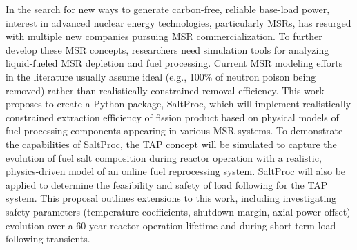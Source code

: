 In the search for new ways to generate carbon-free, reliable 
base-load power, interest in advanced nuclear energy technologies, 
particularly \glspl{MSR}, has resurged with multiple new companies 
pursuing \gls{MSR} commercialization. To further develop these \gls{MSR} 
concepts, researchers need simulation tools for analyzing liquid-fueled 
\gls{MSR} depletion and fuel processing. Current \gls{MSR} modeling efforts in 
the literature usually assume ideal (e.g., 100\% of neutron poison being 
removed) rather than realistically constrained removal efficiency. This work 
proposes to create a Python package, SaltProc, which will implement 
realistically constrained extraction efficiency of fission product based on 
physical models of fuel processing components appearing in various \gls{MSR} 
systems. To demonstrate the capabilities of SaltProc, the \gls{TAP} concept 
will be simulated to capture the evolution of fuel salt composition during 
reactor operation with a realistic, physics-driven model of an online fuel 
reprocessing system. SaltProc will also be applied to determine the 
feasibility and safety of load following for the \gls{TAP} system. This 
proposal outlines extensions to this work, including investigating safety 
parameters (temperature coefficients, shutdown margin, axial power offset) 
evolution over a 60-year reactor operation lifetime and during short-term 
load-following transients.



